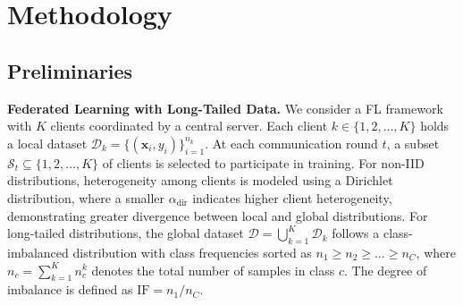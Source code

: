 \documentclass[10pt,twocolumn,letterpaper]{article}
\begin{document}
\section{Methodology}

\subsection{Preliminaries}

\noindent\textbf{Federated Learning with Long-Tailed Data.} We consider a FL framework with $K$ clients coordinated by a central server. Each client $k \!\in\! \{1, 2, \ldots, K\}$ holds a local dataset $\mathcal{D}_k \!=\! \{(\mathbf{x}_i, y_i)\}_{i=1}^{n_k}$. At each communication round $t$, a subset $\mathcal{S}_t \!\subseteq\! \{1, 2, \ldots, K\}$ of clients is selected to participate in training. For non-IID distributions, heterogeneity among clients is modeled using a Dirichlet distribution, where a smaller $\alpha_{\text{dir}}$ indicates higher client heterogeneity, demonstrating greater divergence between local and global distributions. For long-tailed distributions, the global dataset $\mathcal{D} \!=\! \bigcup_{k=1}^K \!\mathcal{D}_k$ follows a class-imbalanced distribution with class frequencies sorted as $n_1 \!\geq\! n_2 \!\geq\! \dots \!\geq\! n_C$, where $n_c \!=\! \sum_{k=1}^{K} \!n_c^k$ denotes the total number of samples in class $c$. The degree of imbalance is defined as $\mathrm{IF} \!=\! n_1 / n_C$.



\end{document}
